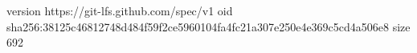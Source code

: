 version https://git-lfs.github.com/spec/v1
oid sha256:38125c46812748d484f59f2ce5960104fa4fc21a307e250e4e369c5cd4a506e8
size 692
